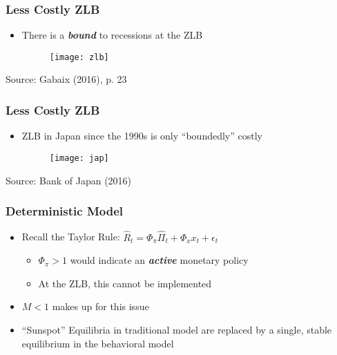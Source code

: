 \documentclass{beamer}
\begin{document}

\begin{frame}
	\frametitle{Less Costly ZLB}
	\begin{itemize}
		\item There is a \textit{\textbf{bound}} to recessions at the ZLB
		\begin{figure}[h]
			\texttt{[image: zlb]}
		\end{figure}
	\end{itemize}	
	{\footnotesize Source: Gabaix (2016), p. 23}
\end{frame}
 

\begin{frame}
	\frametitle{Less Costly ZLB}
	\begin{itemize}
		\item ZLB in Japan since the 1990s is only ``boundedly'' costly
		\begin{figure}[h]
			\texttt{[image: jap]}
		\end{figure}
	\end{itemize}
	{\footnotesize Source: Bank of Japan (2016)}
\end{frame}

 
\begin{frame}
	\frametitle{Deterministic Model}
	\begin{itemize}
		\item Recall the Taylor Rule: $\hat{R}_{t}=\Phi_{\pi}\hat{\Pi}_{t}+\Phi_{x}x_{t}+\epsilon_{t}$
		\vspace{8pt}
		\begin{itemize}
			\item $\Phi_{\pi} > 1$ would indicate an \textit{\textbf{active}} monetary policy
			\item At the ZLB, this cannot be implemented
		\end{itemize}
		\vspace{8pt}
		\item $M < 1$ makes up for this issue
		\item ``Sunspot'' Equilibria in traditional model are replaced by a single, stable equilibrium in the behavioral model
	\end{itemize}
\end{frame}

 
\end{document}
